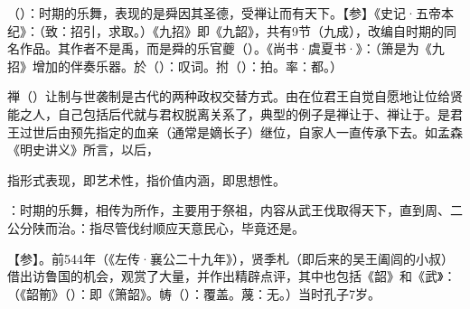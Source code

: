 {
\begin{lyitemize}
\item {}（）：时期的乐舞，表现的是舜因其圣德，受禅让而有天下。【参】《史记·五帝本纪》：（致：招引，求取。）《九招》即《九韶》，共有9节（九成），改编自时期的同名作品。其作者不是禹，而是舜的乐官夔（）。《尚书·虞夏书·》：（箫是为《九招》增加的伴奏乐器。於（）：叹词。拊（）：拍。率：都。）

禅（）让制与世袭制是古代的两种政权交替方式。由在位君王自觉自愿地让位给贤能之人，自己包括后代就与君权脱离关系了，典型的例子是禅让于、禅让于。是君王过世后由预先指定的血亲（通常是嫡长子）继位，自家人一直传承下去。如孟森《明史讲义》所言，以后， %

\item {}指形式表现，即艺术性，指价值内涵，即思想性。

\item {}：时期的乐舞，相传为所作，主要用于祭祖，内容从武王伐取得天下，直到周、二公分陕而治。：指尽管伐纣顺应天意民心，毕竟还是。
\end{lyitemize}
【参】。前544年（《左传·襄公二十九年》），贤季札（即后来的吴王阖闾的小叔）借出访鲁国的机会，观赏了大量，并作出精辟点评，其中也包括《韶》和《武》：（《韶箾》（）：即《箫韶》。帱（）：覆盖。蔑：无。）当时孔子7岁。
}
{}


